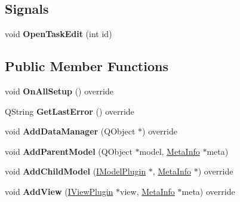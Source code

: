 \subsection*{Signals}
\begin{DoxyCompactItemize}
\item 
void {\bfseries Open\+Task\+Edit} (int id)\hypertarget{class_task_tree_model_a84903b8013728be8447018eaca9d5d40}{}\label{class_task_tree_model_a84903b8013728be8447018eaca9d5d40}

\end{DoxyCompactItemize}
\subsection*{Public Member Functions}
\begin{DoxyCompactItemize}
\item 
void {\bfseries On\+All\+Setup} () override\hypertarget{class_task_tree_model_aeef3183a88c527ffd51adf5c0753a5a2}{}\label{class_task_tree_model_aeef3183a88c527ffd51adf5c0753a5a2}

\item 
Q\+String {\bfseries Get\+Last\+Error} () override\hypertarget{class_task_tree_model_a0300da8b58d57891e2287bb9e1cb9d90}{}\label{class_task_tree_model_a0300da8b58d57891e2287bb9e1cb9d90}

\item 
void {\bfseries Add\+Data\+Manager} (Q\+Object $\ast$) override\hypertarget{class_task_tree_model_aa25870b721ec1b86b12e497ad8314e54}{}\label{class_task_tree_model_aa25870b721ec1b86b12e497ad8314e54}

\item 
void {\bfseries Add\+Parent\+Model} (Q\+Object $\ast$model, \hyperlink{struct_meta_info}{Meta\+Info} $\ast$meta)\hypertarget{class_task_tree_model_ae5e240226aeee8ec516546cd7ec34071}{}\label{class_task_tree_model_ae5e240226aeee8ec516546cd7ec34071}

\item 
void {\bfseries Add\+Child\+Model} (\hyperlink{class_i_model_plugin}{I\+Model\+Plugin} $\ast$, \hyperlink{struct_meta_info}{Meta\+Info} $\ast$) override\hypertarget{class_task_tree_model_a62708172afa70e35dd504ee4bb190c06}{}\label{class_task_tree_model_a62708172afa70e35dd504ee4bb190c06}

\item 
void {\bfseries Add\+View} (\hyperlink{class_i_view_plugin}{I\+View\+Plugin} $\ast$view, \hyperlink{struct_meta_info}{Meta\+Info} $\ast$meta) override\hypertarget{class_task_tree_model_af7e15dbbbca38a174c248e110f5c2ab0}{}\label{class_task_tree_model_af7e15dbbbca38a174c248e110f5c2ab0}


\end{DoxyCompactItemize}
